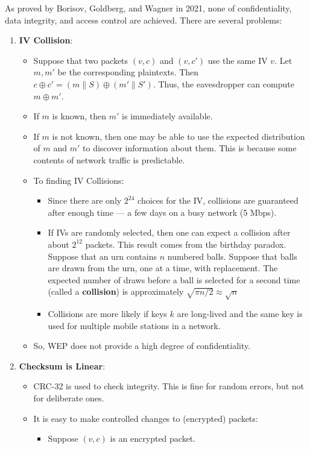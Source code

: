 \documentclass[12pt,titlepage]{article}
\begin{document}
As proved by Borisov, Goldberg, and Wagner in 2021, none of confidentiality, data integrity, and access control are achieved. There are several problems: \begin{enumerate}
\item \textbf{IV Collision}: \begin{itemize}
\item Suppose that two packets $(v, c)$ and $(v, c')$ use the same IV $v$. Let $m, m'$ be the corresponding plaintexts. Then $c \oplus c' = (m \| S) \oplus (m' \| S')$. Thus, the eavesdropper can compute $m \oplus m'$.
\item If $m$ is known, then $m'$ is immediately available.
\item If $m$ is not known, then one may be able to use the expected distribution of $m$ and $m'$ to discover information about them. This is because some contents of network traffic is predictable.
\item To finding IV Collisions: \begin{itemize}
\item Since there are only $2^{24}$ choices for the IV, collisions are guaranteed after enough time — a few days on a busy network (5 Mbps).
\item If IVs are randomly selected, then one can expect a collision after about $2^{12}$ packets. This result comes from the birthday paradox. Suppose that an urn contains $n$ numbered balls. Suppose that balls are drawn from the urn, one at a time, with replacement. The expected number of draws before a ball is selected for a second time (called a \textbf{collision}) is approximately $\sqrt{\pi n/ 2} \approx \sqrt{n}$
\item Collisions are more likely if keys $k$ are long-lived and the same key is used for multiple mobile stations in a network.
\end{itemize}
\item So, WEP does not provide a high degree of confidentiality.
\end{itemize}
\item \textbf{Checksum is Linear}: \begin{itemize}
\item CRC-32 is used to check integrity. This is fine for random errors, but not for deliberate ones.
\item It is easy to make controlled changes to (encrypted) packets:\begin{itemize}
\item Suppose $(v, c)$ is an encrypted packet.

\end{itemize}
\end{itemize}
\end{enumerate}
\end{document}
